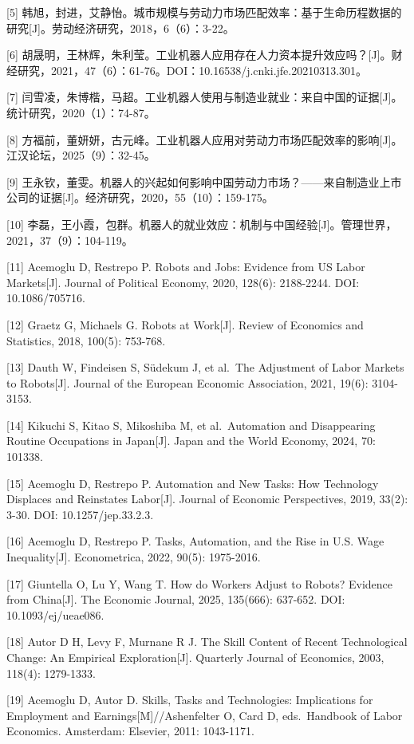 {[}5{]} 韩旭，封进，艾静怡。城市规模与劳动力市场匹配效率：基于生命历程数据的研究{[}J{]}。劳动经济研究，2018，6（6）：3-22。

{[}6{]} 胡晟明，王林辉，朱利莹。工业机器人应用存在人力资本提升效应吗？{[}J{]}。财经研究，2021，47（6）：61-76。DOI：10.16538/j.cnki.jfe.20210313.301。

{[}7{]} 闫雪凌，朱博楷，马超。工业机器人使用与制造业就业：来自中国的证据{[}J{]}。统计研究，2020（1）：74-87。

{[}8{]} 方福前，董妍妍，古元峰。工业机器人应用对劳动力市场匹配效率的影响{[}J{]}。江汉论坛，2025（9）：32-45。

{[}9{]} 王永钦，董雯。机器人的兴起如何影响中国劳动力市场？------来自制造业上市公司的证据{[}J{]}。经济研究，2020，55（10）：159-175。

{[}10{]} 李磊，王小霞，包群。机器人的就业效应：机制与中国经验{[}J{]}。管理世界，2021，37（9）：104-119。

{[}11{]} Acemoglu D, Restrepo P. Robots and Jobs: Evidence from US Labor Markets{[}J{]}. Journal of Political Economy, 2020, 128(6): 2188-2244. DOI: 10.1086/705716.

{[}12{]} Graetz G, Michaels G. Robots at Work{[}J{]}. Review of Economics and Statistics, 2018, 100(5): 753-768.

{[}13{]} Dauth W, Findeisen S, Südekum J, et al.~The Adjustment of Labor Markets to Robots{[}J{]}. Journal of the European Economic Association, 2021, 19(6): 3104-3153.

{[}14{]} Kikuchi S, Kitao S, Mikoshiba M, et al.~Automation and Disappearing Routine Occupations in Japan{[}J{]}. Japan and the World Economy, 2024, 70: 101338.

{[}15{]} Acemoglu D, Restrepo P. Automation and New Tasks: How Technology Displaces and Reinstates Labor{[}J{]}. Journal of Economic Perspectives, 2019, 33(2): 3-30. DOI: 10.1257/jep.33.2.3.

{[}16{]} Acemoglu D, Restrepo P. Tasks, Automation, and the Rise in U.S. Wage Inequality{[}J{]}. Econometrica, 2022, 90(5): 1975-2016.

{[}17{]} Giuntella O, Lu Y, Wang T. How do Workers Adjust to Robots? Evidence from China{[}J{]}. The Economic Journal, 2025, 135(666): 637-652. DOI: 10.1093/ej/ueae086.

{[}18{]} Autor D H, Levy F, Murnane R J. The Skill Content of Recent Technological Change: An Empirical Exploration{[}J{]}. Quarterly Journal of Economics, 2003, 118(4): 1279-1333.

{[}19{]} Acemoglu D, Autor D. Skills, Tasks and Technologies: Implications for Employment and Earnings{[}M{]}//Ashenfelter O, Card D, eds.~Handbook of Labor Economics. Amsterdam: Elsevier, 2011: 1043-1171.

